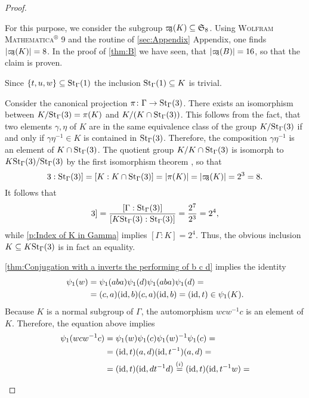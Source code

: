 \begin{proof}
\begin{plist}
For this purpose, we consider the subgroup $\varpikern_3(K)\subseteq \mathfrak{S}_8$. Using \textsc{Wolfram Mathematica$^\circledR$ 9} and the routine of \ref{sec:Appendix} Appendix, one finds $\lvert\varpikern_3(K)\rvert=8$. In the proof of \cref{thm:B} we have seen, that $\lvert\varpikern_3(B)\rvert=16$, so that the claim is proven.
\item Since $\lbrace t,u,w\rbrace\subseteq\St[\Gamma]{1}$ the inclusion $\St[\Gamma]{1}\subseteq K$ is trivial.

Consider the canonical projection $\pi\colon\Gamma\to\St[\Gamma]{3}$. There exists an isomorphism between $\nicefrac{K}{\St[\Gamma]{3}}=\pi(K)$ and $\nicefrac{K}{(K\cap\St[\Gamma]{3})}$. This follows from the fact, that two elements $\gamma,\eta$ of $K$ are in the same equivalence class of the group $\nicefrac{K}{\St[\Gamma]{3}}$ if and only if $\gamma\eta^{-1}\in K$ is contained in $\St[\Gamma]{3}$. Therefore, the composition $\gamma\eta^{-1}$ is an element of $K\cap\St[\Gamma]{3}$. The quotient group $\nicefrac{K}{K\cap\St[\Gamma]{3}}$ is isomorph to $\nicefrac{K\St[\Gamma]{3}}{\St[\Gamma]{3}}$ by the first isomorphism theorem , so that
\begin{equation*}
[K\St[\Gamma]{3}:\St[\Gamma]{3}]=[K:K\cap\St[\Gamma]{3}]=\lvert \pi(K)\rvert=\lvert\varpikern_3(K)\rvert=2^3=8.
\end{equation*}
It follows that
\begin{equation*}
[\Gamma:K\St[\Gamma]{3}]=\frac{[\Gamma:\St[\Gamma]{3}]}{[K\St[\Gamma]{3}:\St[\Gamma]{3}]}=\frac{2^7}{2^3}=2^4,
\end{equation*}
while \ref{p:Index of K in Gamma} implies $[\Gamma:K]=2^4.$ Thus, the obvious inclusion $K\subseteq K\St[\Gamma]{3}$ is in fact an equality.
\item \label{p:Base Case psi(K) contains K} \cref{thm:Conjugation with a inverts the performing of b c d} implies the identity
\begin{align*}
\psi_1(w)	&=\psi_1(aba)\psi_1(d)\psi_1(aba)\psi_1(d)=\\
			&=(c,a)(\id,b)(c,a)(\id,b)=(\id,t)\in\psi_1(K).
\end{align*}
Because $K$ is a normal subgroup of $\Gamma$, the automorphism $wcw^{-1}c$ is an element of $K$. Therefore, the equation above implies
\begin{align*}
\psi_1(wcw^{-1}c)	&=\psi_1(w)\psi_1(c)\psi_1(w)^{-1}\psi_1(c)=\\
					&=(\id,t)(a,d)(\id,t^{-1})(a,d)=\\
					&=(\id,t)(\id,dt^{-1}d)\overset{(i)}{=}(\id,t)(\id,t^{-1}w)=\\

\end{align*}
\end{plist}
\end{proof}
